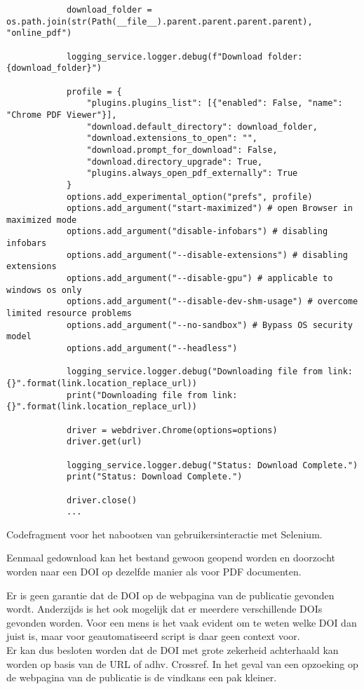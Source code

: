 \begin{itemize}
\begin{listing}
\begin{verbatim}
            download_folder = os.path.join(str(Path(__file__).parent.parent.parent.parent), "online_pdf")
            
            logging_service.logger.debug(f"Download folder: {download_folder}")
            
            profile = {
                "plugins.plugins_list": [{"enabled": False, "name": "Chrome PDF Viewer"}],
                "download.default_directory": download_folder,
                "download.extensions_to_open": "",
                "download.prompt_for_download": False,
                "download.directory_upgrade": True,
                "plugins.always_open_pdf_externally": True
            }
            options.add_experimental_option("prefs", profile)
            options.add_argument("start-maximized") # open Browser in maximized mode
            options.add_argument("disable-infobars") # disabling infobars
            options.add_argument("--disable-extensions") # disabling extensions
            options.add_argument("--disable-gpu") # applicable to windows os only
            options.add_argument("--disable-dev-shm-usage") # overcome limited resource problems
            options.add_argument("--no-sandbox") # Bypass OS security  model
            options.add_argument("--headless")
            
            logging_service.logger.debug("Downloading file from link: {}".format(link.location_replace_url))
            print("Downloading file from link: {}".format(link.location_replace_url))
            
            driver = webdriver.Chrome(options=options)
            driver.get(url)
            
            logging_service.logger.debug("Status: Download Complete.")
            print("Status: Download Complete.")
            
            driver.close()
            ...
        \end{verbatim}
        \caption[Selenium codefragment]{Codefragment voor het nabootsen van gebruikersinteractie met Selenium.}
        \label{code:DOIselenium}
    \end{listing} Eenmaal gedownload kan het bestand gewoon geopend worden en doorzocht worden naar een DOI op dezelfde manier als voor PDF documenten.
\end{itemize}
Er is geen garantie dat de DOI op de webpagina van de publicatie gevonden wordt. Anderzijds is het ook mogelijk dat er meerdere verschillende DOIs gevonden worden. Voor een mens is het vaak evident om te weten welke DOI dan juist is, maar voor geautomatiseerd script is daar geen context voor.\\
Er kan dus besloten worden dat de DOI met grote zekerheid achterhaald kan worden op basis van de URL of adhv. Crossref. In het geval van een opzoeking op de webpagina van de publicatie is de vindkans een pak kleiner.

